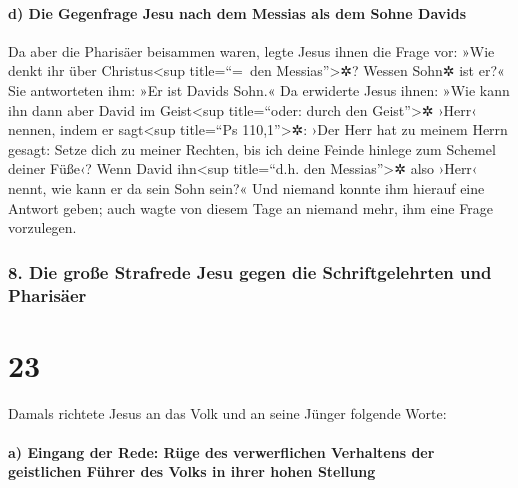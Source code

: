 \hypertarget{d-die-gegenfrage-jesu-nach-dem-messias-als-dem-sohne-davids}{%
\paragraph{d) Die Gegenfrage Jesu nach dem Messias als dem Sohne
Davids}\label{d-die-gegenfrage-jesu-nach-dem-messias-als-dem-sohne-davids}}

 Da aber die Pharisäer beisammen waren, legte Jesus ihnen
die Frage vor:  »Wie denkt ihr über Christus\textless sup
title=``=~den Messias''\textgreater✲? Wessen Sohn✲ ist er?« Sie
antworteten ihm: »Er ist Davids Sohn.«  Da erwiderte
Jesus ihnen: »Wie kann ihn dann aber David im Geist\textless sup
title=``oder: durch den Geist''\textgreater✲ ›Herr‹ nennen, indem er
sagt\textless sup title=``Ps 110,1''\textgreater✲:  ›Der
Herr hat zu meinem Herrn gesagt: Setze dich zu meiner Rechten, bis ich
deine Feinde hinlege zum Schemel deiner Füße‹?  Wenn
David ihn\textless sup title=``d.h. den Messias''\textgreater✲ also
›Herr‹ nennt, wie kann er da sein Sohn sein?«  Und
niemand konnte ihm hierauf eine Antwort geben; auch wagte von diesem
Tage an niemand mehr, ihm eine Frage vorzulegen.

\hypertarget{die-grouxdfe-strafrede-jesu-gegen-die-schriftgelehrten-und-pharisuxe4er}{%
\subsubsection{8. Die große Strafrede Jesu gegen die Schriftgelehrten
und
Pharisäer}\label{die-grouxdfe-strafrede-jesu-gegen-die-schriftgelehrten-und-pharisuxe4er}}

\hypertarget{section-22}{%
\section{23}\label{section-22}}

 Damals richtete Jesus an das Volk und an seine Jünger
folgende Worte:

\hypertarget{a-eingang-der-rede-ruxfcge-des-verwerflichen-verhaltens-der-geistlichen-fuxfchrer-des-volks-in-ihrer-hohen-stellung}{%
\paragraph{a) Eingang der Rede: Rüge des verwerflichen Verhaltens der
geistlichen Führer des Volks in ihrer hohen
Stellung}\label{a-eingang-der-rede-ruxfcge-des-verwerflichen-verhaltens-der-geistlichen-fuxfchrer-des-volks-in-ihrer-hohen-stellung}}

